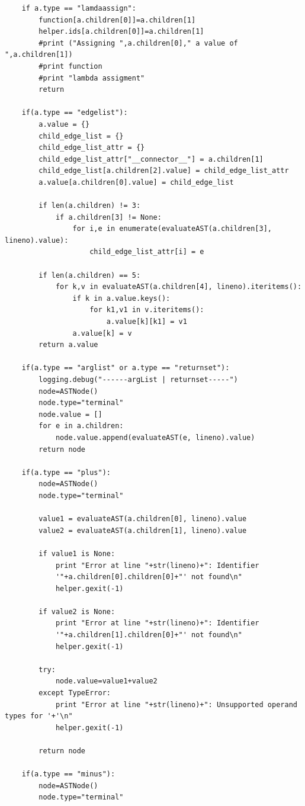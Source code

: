 \documentclass[a4paper]{article}
\begin{document}
\begin{verbatim}
    if a.type == "lamdaassign":
        function[a.children[0]]=a.children[1]
        helper.ids[a.children[0]]=a.children[1]
        #print ("Assigning ",a.children[0]," a value of ",a.children[1])
        #print function
        #print "lambda assigment"
        return 

    if(a.type == "edgelist"):
        a.value = {}
        child_edge_list = {}
        child_edge_list_attr = {}
        child_edge_list_attr["__connector__"] = a.children[1]
        child_edge_list[a.children[2].value] = child_edge_list_attr
        a.value[a.children[0].value] = child_edge_list

        if len(a.children) != 3:
            if a.children[3] != None:
                for i,e in enumerate(evaluateAST(a.children[3], lineno).value):
                    child_edge_list_attr[i] = e

        if len(a.children) == 5:
            for k,v in evaluateAST(a.children[4], lineno).iteritems():
                if k in a.value.keys():
                    for k1,v1 in v.iteritems():
                        a.value[k][k1] = v1
                a.value[k] = v
        return a.value

    if(a.type == "arglist" or a.type == "returnset"):
        logging.debug("------argList | returnset-----")
        node=ASTNode()
        node.type="terminal"
        node.value = []
        for e in a.children:
            node.value.append(evaluateAST(e, lineno).value)
        return node

    if(a.type == "plus"):
        node=ASTNode()
        node.type="terminal"

        value1 = evaluateAST(a.children[0], lineno).value
        value2 = evaluateAST(a.children[1], lineno).value

        if value1 is None:
            print "Error at line "+str(lineno)+": Identifier 
            '"+a.children[0].children[0]+"' not found\n"
            helper.gexit(-1)

        if value2 is None:
            print "Error at line "+str(lineno)+": Identifier 
            '"+a.children[1].children[0]+"' not found\n"
            helper.gexit(-1)

        try:
            node.value=value1+value2
        except TypeError:
            print "Error at line "+str(lineno)+": Unsupported operand types for '+'\n"
            helper.gexit(-1)

        return node

    if(a.type == "minus"):
        node=ASTNode()
        node.type="terminal"


\end{verbatim}
\end{document}
